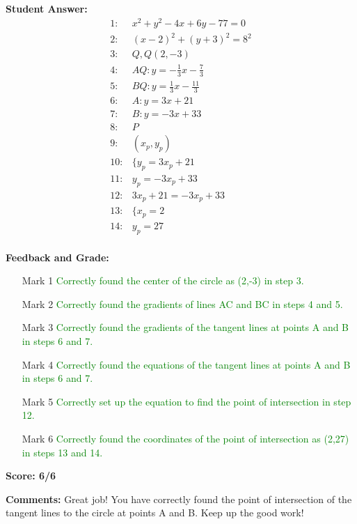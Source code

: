 \documentclass{article}
\begin{document}
\textbf{Student Answer:}
\begin{align*}
1: & x^2+y^2-4x+6y-77=0 \\
2: & (x-2)^2+(y+3)^2=8^2 \\
3: & Q,Q(2,-3) \\
4: & AQ:y=-\frac{1}{3}x-\frac{7}{3} \\
5: & BQ:y=\frac{1}{3}x-\frac{11}{3} \\
6: & A:y=3x+21 \\
7: & B:y=-3x+33 \\
8: & P \\
9: & (x_p,y_p) \\
10: & \{y_p=3x_p+21 \\
11: & y_p=-3x_p+33 \\
12: & 3x_p+21=-3x_p+33 \\
13: & \{x_p=2 \\
14: & y_p=27 \\
\end{align*}

\textbf{Feedback and Grade:}
\begin{itemize}
\item[Mark 1] \textcolor{green}{Correctly found the center of the circle as (2,-3) in step 3.}
\item[Mark 2] \textcolor{green}{Correctly found the gradients of lines AC and BC in steps 4 and 5.}
\item[Mark 3] \textcolor{green}{Correctly found the gradients of the tangent lines at points A and B in steps 6 and 7.}
\item[Mark 4] \textcolor{green}{Correctly found the equations of the tangent lines at points A and B in steps 6 and 7.}
\item[Mark 5] \textcolor{green}{Correctly set up the equation to find the point of intersection in step 12.}
\item[Mark 6] \textcolor{green}{Correctly found the coordinates of the point of intersection as (2,27) in steps 13 and 14.}
\end{itemize}

\textbf{Score: 6/6}

\textbf{Comments:} Great job! You have correctly found the point of intersection of the tangent lines to the circle at points A and B. Keep up the good work!
\end{document}
